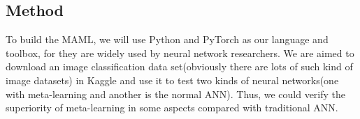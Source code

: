 \documentclass[../proposal.tex]{subfiles}
\begin{document}
\subsection{Method}
To build the MAML, we will use Python and PyTorch as our language and toolbox, for they are widely used by neural network researchers. We are aimed to download an image classification data set(obviously there are lots of such kind of image datasets) in Kaggle and use it to test two kinds of neural networks(one with meta-learning and another is the normal ANN). Thus, we could verify the superiority of meta-learning in some aspects compared with traditional ANN.
\end{document}
